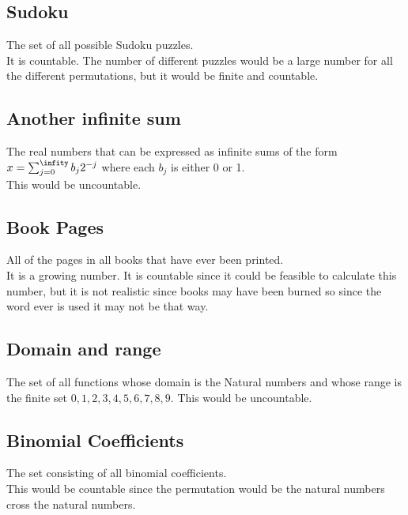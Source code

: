 \subsection{Sudoku}
The set of all possible Sudoku puzzles.
\\ 
It is countable. The number of different puzzles would be a large number for all the different permutations, but it would be finite and countable. \\ 


\subsection{Another infinite sum} 
The real numbers that can be expressed as infinite sums of the form \\ 
$x= \sum_{j=0}^\infity b_j2^{-j}$ where each $b_j$ is either 0 or 1. \\ 

This would be uncountable. 
\subsection{Book Pages}
All of the pages in all books that have ever been printed. 
\\ 
It is a growing number. It is countable since it could be feasible to calculate this number, but it is not realistic since books may have been burned so since the word ever is used it may not be that way. 

\subsection{Domain and range}
The set of all functions whose domain is the Natural numbers and whose range is the finite set ${0,1,2,3,4,5,6,7,8,9}.$
This would be uncountable. 
\subsection{Binomial Coefficients}
The set consisting of all binomial coefficients.
\\ 
This would be countable since the permutation would be the natural numbers cross the natural numbers. 
